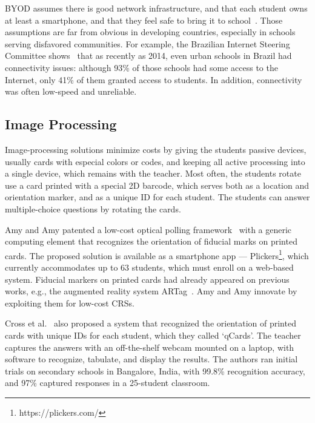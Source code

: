 BYOD assumes there is good network infrastructure, and that each student owns at least a smartphone, and that they feel safe to bring it to school~\cite{stavert2013byod}.  Those assumptions are far from obvious in developing countries, especially in schools serving disfavored communities. For example, the Brazilian Internet Steering Committee shows~\cite{CGIbr2014ITCeducation} that as recently as 2014, even urban schools in Brazil had connectivity issues: although 93\% of those schools had some access to the Internet, only 41\% of them granted access to students. In addition, connectivity was often low-speed and unreliable.


\subsection{Image Processing}

Image-processing solutions minimize costs by giving the students passive devices, usually cards with especial colors or codes, and keeping all active processing into a single device, which remains with the teacher. Most often, the students rotate use a card printed with a special 2D barcode, which serves both as a location and orientation marker, and as a unique ID for each student. The students can answer multiple-choice questions by rotating the cards.

Amy and Amy patented a low-cost optical polling framework~\cite{nolan:2011:biblatex} with a generic computing element that recognizes the orientation of fiducial marks on printed cards. The proposed solution is available as a smartphone app --- Plickers\footnote{https://plickers.com/}, which currently accommodates up to 63 students, which must enroll on a web-based system. Fiducial markers on printed cards had already appeared on previous works, e.g., the augmented reality system ARTag~\cite{fiala2005artag}. Amy and Amy innovate by exploiting them for low-cost CRSs. %

Cross et al.~\cite{cross2012low} also proposed a system that recognized the orientation of printed cards with unique IDs for each student, which they called  ‘qCards’. The teacher captures the answers with an off-the-shelf webcam mounted on a laptop, with software to recognize, tabulate, and display the results. The authors ran initial trials on secondary schools in Bangalore, India, with 99.8\% recognition accuracy, and 97\% captured responses in a 25-student classroom.

